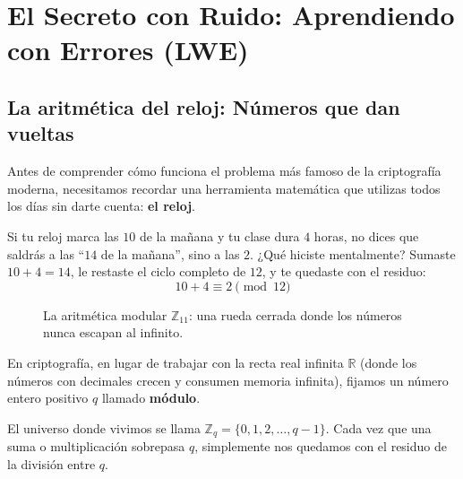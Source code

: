 \chapter{El Secreto con Ruido: Aprendiendo con Errores (LWE)}
\label{cap:lwe_ruido}

\section{La aritmética del reloj: Números que dan vueltas}

Antes de comprender cómo funciona el problema más famoso de la criptografía moderna, necesitamos recordar una herramienta matemática que utilizas todos los días sin darte cuenta: \textbf{el reloj}.

Si tu reloj marca las $10$ de la mañana y tu clase dura $4$ horas, no dices que saldrás a las ``$14$ de la mañana'', sino a las $2$. ¿Qué hiciste mentalmente? Sumaste $10 + 4 = 14$, le restaste el ciclo completo de $12$, y te quedaste con el residuo:
\[
10 + 4 \equiv 2 \pmod{12}
\]

\begin{figure}[htbp]
\centering
{}
\caption{La aritmética modular $\mathbb{Z}_{11}$: una rueda cerrada donde los números nunca escapan al infinito.}
\label{fig:reloj_modular}
\end{figure}

En criptografía, en lugar de trabajar con la recta real infinita $\mathbb{R}$ (donde los números con decimales crecen y consumen memoria infinita), fijamos un número entero positivo $q$ llamado \textbf{módulo}. 

El universo donde vivimos se llama $\mathbb{Z}_q = \{0, 1, 2, \dots, q-1\}$. Cada vez que una suma o multiplicación sobrepasa $q$, simplemente nos quedamos con el residuo de la división entre $q$.

